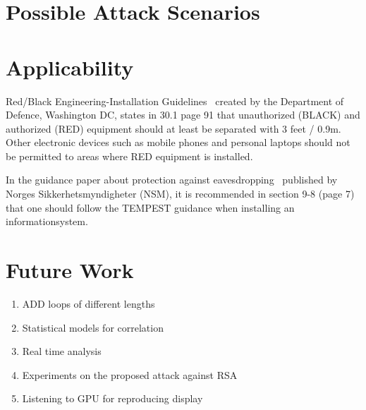 \section{Possible Attack Scenarios}\label{chp6:sec:attack_scenarios}


\section{Applicability}\label{chp6:sec:applicability}

Red/Black Engineering-Installation Guidelines~\cite{MIL_HDBK_232} created by the Department of Defence, Washington DC, states in 30.1 page 91 that unauthorized (BLACK) and authorized (RED) equipment should at least be separated with 3 feet / 0.9m. 
Other electronic devices such as mobile phones and personal laptops should not be permitted to areas where RED equipment is installed. 

In the guidance paper about protection against eavesdropping~\cite{NSM_avlytting} published by Norges Sikkerhetsmyndigheter (NSM), it is recommended in section 9-8 (page 7) that one should follow the TEMPEST guidance when installing an informationsystem.

\section{Future Work}\label{chp6:sec:future_work}
\begin{enumerate}
	\item ADD loops of different lengths
	\item Statistical models for correlation
	\item Real time analysis
	\item Experiments on the proposed attack against RSA
	\item Listening to GPU for reproducing display
\end{enumerate}